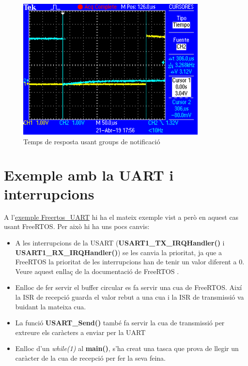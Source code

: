 \begin{figure}
 \centering
 \includegraphics[width=0.85\textwidth, keepaspectratio]{imatges/IRQtoEventGroup.png}
 \caption{Temps de resposta usant groups de notificació}
 \label{fig:IRQtoTaskTime_Group}
\end{figure}

\chapter{Exemple amb la UART i interrupcions}
A l’\href{https://github.com/mariusmm/cursembedded/tree/master/Simplicity/FreeRTOS_UART}{exemple Freertos\_UART} hi ha el mateix exemple vist a  però en aquest cas usant FreeRTOS. Per això hi ha uns pocs canvis:
\begin{itemize}
 \item A les interrupcions de la USART ({\bf USART1\_TX\_IRQHandler()} i {\bf USART1\_RX\_IRQHandler()}) se les canvia la prioritat, ja que a FreeRTOS la prioritat de les interrupcions han de tenir un valor diferent a 0. Veure aquest enllaç de la documentació de FreeRTOS \cite{FreeRTOSIRQ}.
 \item Enlloc de fer servir el \gls{buffer circular} es fa servir una cua de FreeRTOS. Així la \gls{ISR} de recepció guarda el valor rebut a una cua i la \gls{ISR} de transmissió va buidant la mateixa cua.
 \item La funció {\bf USART\_Send()} també fa servir la cua de transmissió per extreure els caràcters a enviar per la UART
 \item Enlloc d’un {\em while(1)} al {\bf main()}, s'ha creat una tasca que prova de llegir un caràcter de la cua de recepció per fer la seva feina.
\end{itemize}

